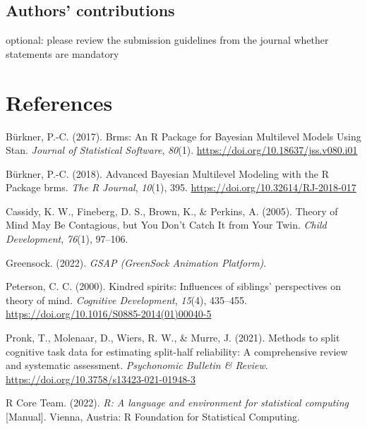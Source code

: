 \documentclass[
  man,floatsintext]{apa6}
\newlength{\cslhangindent}
\newlength{\cslentryspacingunit} %
\newenvironment{CSLReferences}[2] %
 {%
  \setlength{\parindent}{0pt}
  \ifodd #1
  \let\oldpar\par
  \def\par{\hangindent=\cslhangindent\oldpar}
  \fi
  \setlength{\parskip}{#2\cslentryspacingunit}
 }%
 {}
\begin{document}
\hypertarget{authors-contributions}{%
\subsection{Authors' contributions}\label{authors-contributions}}

optional: please review the submission guidelines from the journal whether statements are mandatory

\newpage

\hypertarget{references}{%
\section{References}\label{references}}

\begingroup
\setlength{\parindent}{-0.5in}
\setlength{\leftskip}{0.5in}

\hypertarget{refs}{}
\begin{CSLReferences}{1}{0}
\leavevmode{}%
Bürkner, P.-C. (2017). Brms: {An R Package} for {Bayesian Multilevel Models Using Stan}. \emph{Journal of Statistical Software}, \emph{80}(1). \url{https://doi.org/10.18637/jss.v080.i01}

\leavevmode{}%
Bürkner, P.-C. (2018). Advanced {Bayesian Multilevel Modeling} with the {R Package} brms. \emph{The R Journal}, \emph{10}(1), 395. \url{https://doi.org/10.32614/RJ-2018-017}

\leavevmode{}%
Cassidy, K. W., Fineberg, D. S., Brown, K., \& Perkins, A. (2005). Theory of {Mind May Be Contagious}, but {You Don}'t {Catch It} from {Your Twin}. \emph{Child Development}, \emph{76}(1), 97--106.

\leavevmode{}%
Greensock. (2022). \emph{{GSAP} ({GreenSock Animation Platform})}.

\leavevmode{}%
Peterson, C. C. (2000). Kindred spirits: {Influences} of siblings' perspectives on theory of mind. \emph{Cognitive Development}, \emph{15}(4), 435--455. \url{https://doi.org/10.1016/S0885-2014(01)00040-5}

\leavevmode{}%
Pronk, T., Molenaar, D., Wiers, R. W., \& Murre, J. (2021). Methods to split cognitive task data for estimating split-half reliability: {A} comprehensive review and systematic assessment. \emph{Psychonomic Bulletin \& Review}. \url{https://doi.org/10.3758/s13423-021-01948-3}

\leavevmode{}%
R Core Team. (2022). \emph{R: {A} language and environment for statistical computing} {[}Manual{]}. {Vienna, Austria}: {R Foundation for Statistical Computing}.

\end{CSLReferences}
\end{document}

